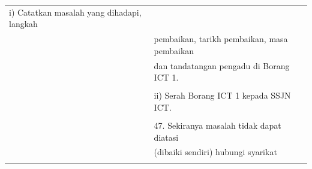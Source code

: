 \documentclass[
]{article}
\begin{document}
\begin{longtable}[]{@{}ll@{}}
\begin{minipage}[t]{0.71\columnwidth}
i) Catatkan masalah yang dihadapi, langkah\strut
\end{minipage}\tabularnewline
\begin{minipage}[t]{0.23\columnwidth}\raggedright
\strut
\end{minipage} & \begin{minipage}[t]{0.71\columnwidth}\raggedright
pembaikan, tarikh pembaikan, masa pembaikan\strut
\end{minipage}\tabularnewline
\begin{minipage}[t]{0.23\columnwidth}\raggedright
\strut
\end{minipage} & \begin{minipage}[t]{0.71\columnwidth}\raggedright
dan tandatangan pengadu di Borang ICT 1.\strut
\end{minipage}\tabularnewline
\begin{minipage}[t]{0.23\columnwidth}\raggedright
\strut
\end{minipage} & \begin{minipage}[t]{0.71\columnwidth}\raggedright
\strut
\end{minipage}\tabularnewline
\begin{minipage}[t]{0.23\columnwidth}\raggedright
\strut
\end{minipage} & \begin{minipage}[t]{0.71\columnwidth}\raggedright
ii) Serah Borang ICT 1 kepada SSJN ICT.\strut
\end{minipage}\tabularnewline
\begin{minipage}[t]{0.23\columnwidth}\raggedright
\strut
\end{minipage} & \begin{minipage}[t]{0.71\columnwidth}\raggedright
\strut
\end{minipage}\tabularnewline
\begin{minipage}[t]{0.23\columnwidth}\raggedright
\strut
\end{minipage} & \begin{minipage}[t]{0.71\columnwidth}\raggedright
47. Sekiranya masalah tidak dapat diatasi\strut
\end{minipage}\tabularnewline
\begin{minipage}[t]{0.23\columnwidth}\raggedright
\strut
\end{minipage} & \begin{minipage}[t]{0.71\columnwidth}\raggedright
(dibaiki sendiri) hubungi syarikat\strut
\end{minipage}\tabularnewline
\begin{minipage}[t]{0.23\columnwidth}\raggedright

\end{minipage}
\end{longtable}
\end{document}
